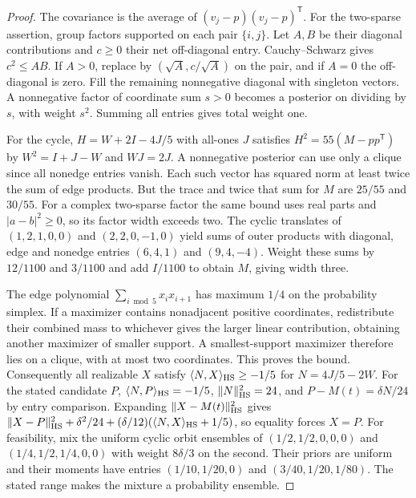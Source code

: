 \documentclass[aps,pra,onecolumn,superscriptaddress,nofootinbib,10pt]{revtex4-2}
\theoremstyle{definition}
\theoremstyle{remark}
\begin{document}
\begin{proof}
The covariance is the average of $(v_j-p)(v_j-p)^{\mathsf T}$.
For the two-sparse assertion, group factors supported on each
pair $\{i,j\}$. Let $A,B$ be their diagonal contributions and
$c\ge0$ their net off-diagonal entry. Cauchy--Schwarz gives
$c^2\le AB$. If $A>0$, replace by $(\sqrt A,c/\sqrt A)$ on the pair,
and if $A=0$ the off-diagonal is zero. Fill the remaining nonnegative
diagonal with singleton vectors. A nonnegative factor of coordinate
sum $s>0$ becomes a posterior on dividing by $s$, with weight
$s^2$. Summing all entries gives total weight one.

For the cycle, $H=W+2I-4J/5$ with all-ones $J$ satisfies
$H^2=55(M-pp^{\mathsf T})$ by $W^2=I+J-W$ and $WJ=2J$.
A nonnegative posterior can use only a clique since all nonedge
entries vanish. Each such vector has squared norm at least twice
the sum of edge products. But the trace and twice that sum for $M$
are $25/55$ and $30/55$. For a complex two-sparse factor the same
bound uses real parts and $|a-b|^2\ge0$, so its factor width exceeds two.
The cyclic translates of $(1,2,1,0,0)$ and $(2,2,0,-1,0)$ yield sums
of outer products with diagonal, edge and nonedge entries
$(6,4,1)$ and $(9,4,-4)$. Weight these sums by $12/1100$ and
$3/1100$ and add $I/1100$ to obtain $M$, giving width three.

The edge polynomial $\sum_{i\bmod5}x_ix_{i+1}$ has maximum $1/4$
on the probability simplex. If a maximizer contains nonadjacent positive
coordinates, redistribute their combined mass to whichever gives the
larger linear contribution, obtaining another maximizer of
smaller support. A smallest-support maximizer therefore lies on
a clique, with at most two coordinates. This proves the bound.
Consequently all realizable $X$ satisfy $\langle N,X\rangle_{\rm HS}
\ge-1/5$ for $N=4J/5-2W$. For the stated candidate $P$,
$\langle N,P\rangle_{\rm HS}=-1/5$, $\|N\|_{\rm HS}^2=24$, and
$P-M(t)=\delta N/24$ by entry comparison. Expanding
$\|X-M(t)\|_{\rm HS}^2$ gives $\|X-P\|_{\rm HS}^2+\delta^2/24+
(\delta/12)(\langle N,X\rangle_{\rm HS}+1/5)$, so equality forces
$X=P$. For feasibility, mix the uniform cyclic orbit ensembles
of $(1/2,1/2,0,0,0)$ and $(1/4,1/2,1/4,0,0)$ with weight
$8\delta/3$ on the second. Their priors are uniform and their
moments have entries $(1/10,1/20,0)$ and $(3/40,1/20,1/80)$.
The stated range makes the mixture a probability ensemble.
\end{proof}
\end{document}
